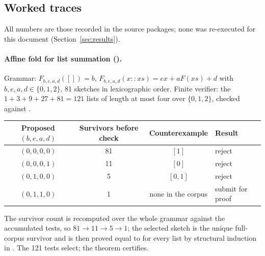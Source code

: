 \subsection{Worked traces}

All numbers are those recorded in the source packages; none was re-executed for this document (Section~\ref{sec:results}).

\paragraph{Affine fold for list summation ().} Grammar: $F_{b,e,a,d}([])=b$, $F_{b,e,a,d}(x::xs)=ex+aF(xs)+d$ with $b,e,a,d\in\{0,1,2\}$, 81 sketches in lexicographic order. Finite verifier: the $1+3+9+27+81=121$ lists of length at most four over $\{0,1,2\}$, checked against .
\begin{center}\small
\begin{tabular}{@{}cccl@{}}
\toprule
Proposed $(b,e,a,d)$ & Survivors before check & Counterexample & Result \\
\midrule
$(0,0,0,0)$ & 81 & $[1]$ & reject \\
$(0,0,0,1)$ & 11 & $[0]$ & reject \\
$(0,1,0,0)$ & 5 & $[0,1]$ & reject \\
$(0,1,1,0)$ & 1 & none in the corpus & submit for proof \\
\bottomrule
\end{tabular}
\end{center}
The survivor count is recomputed over the whole grammar against the accumulated tests, so $81\to11\to5\to1$; the selected sketch is the unique full-corpus survivor and is then proved equal to  for every list by structural induction in . The 121 tests select; the theorem certifies.

